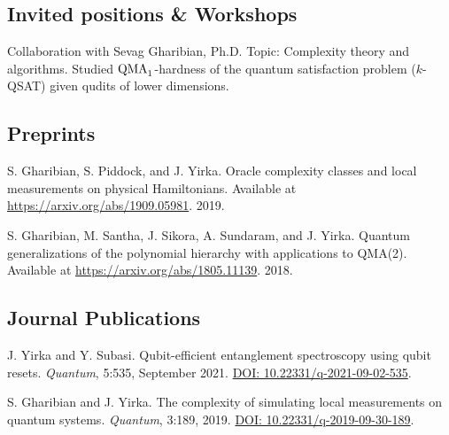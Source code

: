 \documentclass[11pt,letterpaper,serif]{moderncv}
\begin{document}
\subsection{Invited positions \& Workshops}

{
}

{	
	\begin{adjustwidth}{.25in}{}
		Collaboration with Sevag Gharibian, Ph.D. \newline
		Topic: Complexity theory and algorithms. Studied $\textup{QMA}_{1}$-hardness of the quantum satisfaction problem ($k$-QSAT) given qudits of lower dimensions.
	\end{adjustwidth}
}


\subsection{Preprints}
{ \leftskip 0.2in \parindent -0.2in %

S. Gharibian, S. Piddock, and J. Yirka. Oracle complexity classes and local measurements on physical Hamiltonians. Available at \url{https://arxiv.org/abs/1909.05981}. 2019.


S. Gharibian, M. Santha, J. Sikora, A. Sundaram, and J. Yirka. Quantum generalizations of the
polynomial hierarchy with applications to QMA(2). Available at \url{https://arxiv.org/abs/1805.11139}.
2018.

} %


\subsection{Journal Publications}
{ \leftskip 0.2in \parindent -0.2in %

J. Yirka and Y. Subasi. Qubit-efficient entanglement spectroscopy using qubit resets. \textit{Quantum}, 5:535, September 2021. \href{https://doi.org/10.22331/q-2021-09-02-535}{DOI: 10.22331/q-2021-09-02-535}.

S. Gharibian and J. Yirka. The complexity of simulating local measurements on quantum systems. 
\textit{Quantum}, 3:189, 2019. \href{https://doi.org/10.22331/q-2019-09-30-189}{DOI: 10.22331/q-2019-09-30-189}.

}
\end{document}
